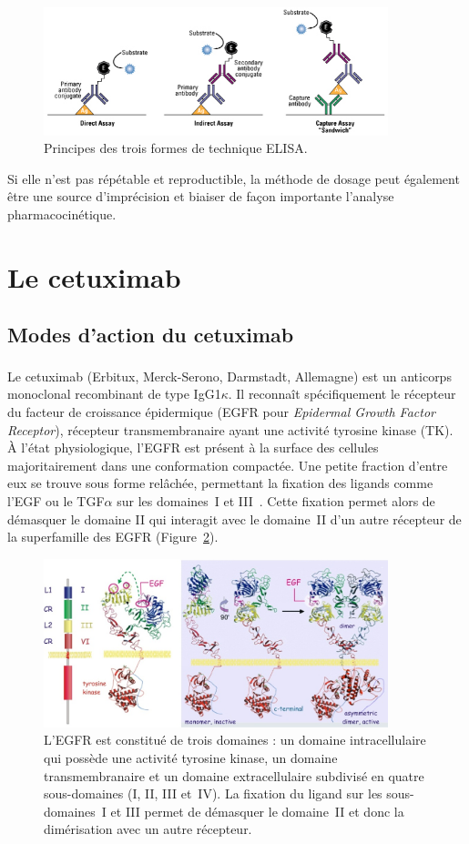 \begin{figure}[htbp]
	\centering
		\includegraphics[width=10cm]{figures/raster/FIG_15}
	\caption{Principes des trois formes de technique ELISA.}
	\label{fig:15}
\end{figure}

Si elle n'est pas répétable et reproductible, la méthode de dosage peut également être une source d'imprécision et biaiser de façon importante l'analyse pharmacocinétique.

\section{Le cetuximab}

\subsection{Modes d'action du cetuximab}
Le cetuximab (Erbitux\textsuperscript{\textregistered}, Merck-Serono, Darmstadt, Allemagne) est un anticorps monoclonal recombinant de type IgG1$\kappa$. Il reconnaît spécifiquement le récepteur du facteur de croissance épidermique (EGFR pour \textit{Epidermal Growth Factor Receptor}), récepteur transmembranaire ayant une activité tyrosine kinase (TK). À l'état physiologique, l'EGFR est présent à la surface des cellules majoritairement dans une conformation compactée. Une petite fraction d'entre eux se trouve sous forme relâchée, permettant la fixation des ligands comme l'EGF ou le TGF$\alpha$ sur les domaines~I et III~\citep{REF97}. Cette fixation permet alors de démasquer le domaine II qui interagit avec le domaine~II d'un autre récepteur de la superfamille des EGFR (Figure~\ref{fig:16}).

\begin{figure}[htbp]
	\centering
		\includegraphics[width=10cm]{figures/raster/FIG_16}
	\caption[Structure de l'EGFR]{L'EGFR est constitué de trois domaines : un domaine intracellulaire qui possède une activité tyrosine kinase, un domaine transmembranaire et un domaine extracellulaire subdivisé en quatre sous-domaines (I, II, III et~IV). La fixation du ligand sur les sous-domaines~I et III permet de démasquer le domaine~II et donc la dimérisation avec un autre récepteur.}
	\label{fig:16}
\end{figure}

